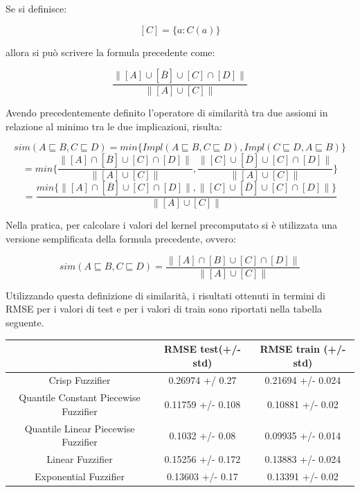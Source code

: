 \documentclass[12pt,a4paper]{report}
\begin{document}
Se si definisce: 

\[ [C] = \{a : C(a) \}\]

allora si può scrivere la formula precedente come:

\[ \frac{\parallel [A] \cup [\overline{B}] \cup [C] \cap [D] \parallel}{\parallel [A] \cup [C] \parallel}\]

Avendo precedentemente definito l'operatore di similarità tra due assiomi in relazione al minimo tra le due implicazioni, risulta:

\[ sim(A \sqsubseteq B, C  \sqsubseteq D) = min\{Impl(A \sqsubseteq B, C\sqsubseteq D), Impl( C\sqsubseteq D, A \sqsubseteq B)\} \]
\[ = min\bigg\{\frac{\parallel [A] \cap [\overline{B}] \cup [C] \cap [D] \parallel}{\parallel [A] \cup [C] \parallel}, \frac{\parallel [C] \cup [\overline{D}] \cup [C] \cap [D] \parallel}{\parallel [A] \cup [C] \parallel}\bigg\}\]
\[ = \frac{min\{\parallel [A] \cap [\overline{B}] \cup [C] \cap [D] \parallel, \parallel [C] \cup [\overline{D}] \cup [C] \cap [D] \parallel\}}{\parallel [A] \cup [C] \parallel}\]

Nella pratica, per calcolare i valori del kernel precomputato si è utilizzata una versione semplificata della formula precedente, ovvero:

\[sim(A \sqsubseteq B, C  \sqsubseteq D) = \frac{\parallel [A] \cap [B] \cup [C] \cap [D] \parallel}{\parallel [A] \cup [C] \parallel} \]

Utilizzando questa definizione di similarità, i risultati ottenuti in termini di RMSE per i valori di test e per i valori di train sono riportati nella tabella seguente.

\begin{table}[h!]
\centering 	
	\begin{tabular}{|c|c|c|} 
	 \hline
	  & RMSE test(+/- std) & RMSE train (+/- std)\\ [0.5ex] 
	 \hline
	 Crisp Fuzzifier & 0.26974 +/ 0.27 & 0.21694 +/- 0.024 \\ 
	 \hline
	 Quantile Constant Piecewise Fuzzifier & 0.11759 +/- 0.108 & 0.10881 +/- 0.02\\
	 \hline
	 Quantile Linear Piecewise Fuzzifier & 0.1032 +/- 0.08 & 0.09935 +/- 0.014\\
	 \hline
	 Linear Fuzzifier & 0.15256 +/- 0.172 & 0.13883 +/- 0.024\\
	 \hline
	 Exponential Fuzzifier & 0.13603 +/- 0.17 & 0.13391 +/- 0.02\\ [1ex] 
	 \hline
	\end{tabular}
\end{table}
\end{document}
